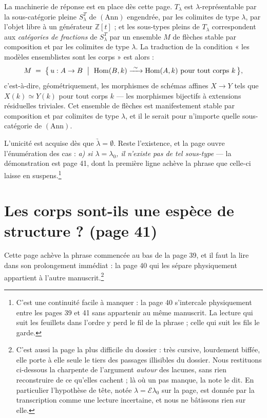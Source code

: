\documentclass[11pt,a4paper]{article}
\begin{document}
La machinerie de réponse est en place dès cette page. $T_{\lambda}$ est
$\lambda$-représentable par la sous-catégorie pleine $S^{T}_{\lambda}$ de
$(\mathrm{Ann})$ engendrée, par les colimites de type $\lambda$, par l'objet
libre à un générateur $\mathbb{Z}[t]$ ; et les sous-types pleins de
$T_{\lambda}$ correspondent aux \emph{catégories de fractions} de
$S^{T}_{\lambda}$ par un ensemble $M$ de flèches stable par composition et par
les colimites de type $\lambda$. La traduction de la condition « les modèles
ensemblistes sont les corps » est alors :
\[
M \;=\; \bigl\{\, u : A \to B \ \bigm|\ \operatorname{Hom}(B,k)
\xrightarrow{\ \sim\ } \operatorname{Hom}(A,k) \ \text{pour tout corps } k
\,\bigr\},
\]
c'est-à-dire, géométriquement, les morphismes de schémas affines
$X \to Y$ tels que $X(k) \simeq Y(k)$ pour tout corps $k$ — les morphismes
bijectifs à extensions résiduelles triviales. Cet ensemble de flèches est
manifestement stable par composition et par colimites de type $\lambda$, et il
le serait pour n'importe quelle sous-catégorie de $(\mathrm{Ann})$.

L'unicité est acquise dès que $\underrightarrow{\lambda} = \emptyset$. Reste
l'existence, et la page ouvre l'énumération des cas : \emph{a) si
$\lambda = \lambda_{0}$, il n'existe pas de tel sous-type} — la démonstration
est page 41, dont la première ligne achève la phrase que
celle-ci laisse en suspens.\footnote{C'est une continuité facile à
manquer : la page 40 s'intercale
physiquement entre les pages 39 et 41 sans appartenir au même manuscrit. La
lecture qui suit les feuillets dans l'ordre y perd le fil de la phrase ; celle
qui suit les fils le garde.}

\section*{Les corps sont-ils une espèce de structure ? (page 41)}

Cette page achève la phrase commencée au bas de la page 39, et il faut la lire dans son prolongement immédiat : la page 40 qui
les sépare physiquement appartient à l'autre manuscrit.\footnote{C'est aussi la
page la plus difficile du dossier : très cursive, lourdement biffée, elle porte
à elle seule le tiers des passages illisibles du dossier. Nous restituons ci-dessous
la charpente de l'argument \emph{autour} des lacunes, sans rien reconstruire de
ce qu'elles cachent ; là où un pas manque, la note le dit. En particulier
l'hypothèse de tête, notée $\lambda = \mathcal{E}\lambda_{0}$ sur la page, est
donnée par la transcription comme une lecture incertaine, et nous ne bâtissons
rien sur elle.}
\end{document}
